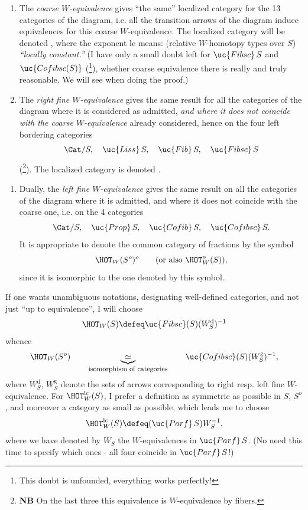 \begin{enumerate}[leftmargin=*]
\item[$1^o$)] The \textit{coarse $W$-equivalence} gives ``the same'' localized category for the 13 categories of the diagram, i.e. all the transition arrows of the diagram induce equivalences for this coarse $W$-equivalence. The localized category will be denoted , where the exponent lc means: (relative $W$-homotopy types over $S$) \textit{``locally constant.''} (I have only a small doubt left for $\uc{Fibsc}\,S$ and $\uc{Cofibsc(S)}$ (\footnote[34]{This doubt is unfounded, everything works perfectly!}), whether coarse equivalence there is really and truly reasonable. We will see when doing the proof.)

\item[$2^o$)] The \textit{right fine $W$-equivalence} gives the same result for all the categories of the diagram where it is considered as admitted, \textit{and where it does not coincide with the coarse $W$-equivalence} already considered, hence on the four left bordering categories
\[
\Cat/S,\quad \uc{Liss}\,S,\quad \uc{Fib}\,S,\quad \uc{Fibsc}\,S
\]
(\footnote[35]{\textbf{NB} On the last three this equivalence is $W$-equivalence by fibers.}). The localized category is denoted .
\end{enumerate}



\begin{enumerate}[leftmargin=*]
\item[$2'^o$)] Dually, the \textit{left fine $W$-equivalence} gives the same result on all the categories of the diagram where it is admitted, and where it does not coincide with the coarse one, i.e. on the 4 categories
\[
\Cat/S,\quad \uc{Prop}\,S,\quad \uc{Cofib}\,S,\quad \uc{Cofibsc}\,S.
\]
It is appropriate to denote the common category of fractions by the symbol
\[
\HOT_W(S^o)^o \qquad \text{(or also $\HOT^o_W(S)$)},
\]
since it is isomorphic to the one denoted by this symbol.
\end{enumerate}

If one wants unambiguous notations, designating well-defined categories, and not just ``up to equivalence'', I will choose
\[
\HOT_W(S) \defeq \uc{Fibsc}(S)(W^{\mathrm{d}}_S)^{-1}
\]
whence
\[
\HOT_W(S^o) \qquad \underbrace{\simeq}_{\text{\footnotesize isomorphism of categories}} \qquad \uc{Cofibsc}(S)(W^{\mathrm{g}}_S)^{-1},
\]
where $W^{\mathrm{d}}_S$, $W^{\mathrm{g}}_S$ denote the sets of arrows corresponding to right resp. left fine $W$-equivalence. For $\HOT^{\mathrm{lc}}_W(S)$, I prefer a definition as symmetric as possible in $S$, $S^o$, and moreover a category as small as possible, which leads me to choose
\[
\HOT^{\mathrm{lc}}_W(S) \defeq (\uc{Parf}\,S)W^{-1}_S,
\]
where we have denoted by $W_S$ the $W$-equivalences in $\uc{Parf}\,S$. (No need this time to specify which ones - all four coincide in $\uc{Parf}\,S$!)

